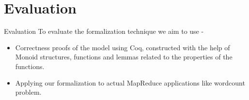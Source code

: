 \section{Evaluation}

\begin{frame}{Evaluation}
To evaluate the formalization technique we aim to use -
\begin{itemize}
	\item Correctness proofs of the model using Coq, constructed with the help of Monoid structures, functions and lemmas related to the properties of the functions.
	\item Applying our formalization to actual MapReduce applications like wordcount problem.
\end{itemize}
\end{frame}
